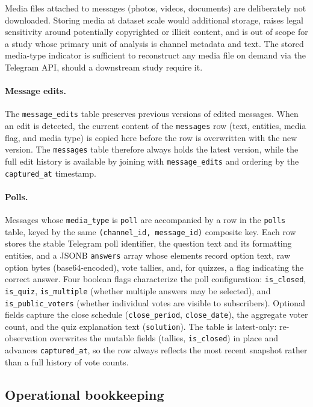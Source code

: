 Media files attached to messages (photos, videos, documents) are deliberately not downloaded. Storing media at dataset scale would additional storage, raises legal sensitivity around potentially copyrighted or illicit content, and is out of scope for a study whose primary unit of analysis is channel metadata and text. The stored media-type indicator is sufficient to reconstruct any media file on demand via the Telegram API, should a downstream study require it.

\paragraph{Message edits.}
The \texttt{message\_edits} table preserves previous versions of edited messages.
When an edit is detected, the current content of the \texttt{messages} row (text, entities, media flag, and media type) is copied here before the row is overwritten with the new version.
The \texttt{messages} table therefore always holds the latest version, while the full edit history is available by joining with \texttt{message\_edits} and ordering by the \texttt{captured\_at} timestamp.

\paragraph{Polls.}
Messages whose \texttt{media\_type} is \texttt{poll} are accompanied by a row in the \texttt{polls} table, keyed by the same \texttt{(channel\_id, message\_id)} composite key.
Each row stores the stable Telegram poll identifier, the question text and its formatting entities, and a JSONB \texttt{answers} array whose elements record option text, raw option bytes (base64-encoded), vote tallies, and, for quizzes, a flag indicating the correct answer.
Four boolean flags characterize the poll configuration: \texttt{is\_closed}, \texttt{is\_quiz}, \texttt{is\_multiple} (whether multiple answers may be selected), and \texttt{is\_public\_voters} (whether individual votes are visible to subscribers).
Optional fields capture the close schedule (\texttt{close\_period}, \texttt{close\_date}), the aggregate voter count, and the quiz explanation text (\texttt{solution}).
The table is latest-only: re-observation overwrites the mutable fields (tallies, \texttt{is\_closed}) in place and advances \texttt{captured\_at}, so the row always reflects the most recent snapshot rather than a full history of vote counts.

\subsection{Operational bookkeeping}

